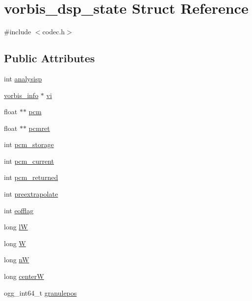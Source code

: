 \hypertarget{structvorbis__dsp__state}{}\section{vorbis\+\_\+dsp\+\_\+state Struct Reference}
\label{structvorbis__dsp__state}


{\ttfamily \#include $<$codec.\+h$>$}

\subsection*{Public Attributes}
\begin{DoxyCompactItemize}
\item 
int \hyperlink{structvorbis__dsp__state_a9b983a6901a311f2d354f2b6c51cf93b}{analysisp}
\item 
\hyperlink{structvorbis__info}{vorbis\+\_\+info} $\ast$ \hyperlink{structvorbis__dsp__state_ab6819a31e79031cdcd8f2ff40a5c1def}{vi}
\item 
float $\ast$$\ast$ \hyperlink{structvorbis__dsp__state_ab33bafd2638e5bea5737709feea89027}{pcm}
\item 
float $\ast$$\ast$ \hyperlink{structvorbis__dsp__state_ab2c2a87593f0d7a3c867ba80102c4260}{pcmret}
\item 
int \hyperlink{structvorbis__dsp__state_a33cf1637859094c31429dace6dfc79e2}{pcm\+\_\+storage}
\item 
int \hyperlink{structvorbis__dsp__state_a6d09bbf3927e337d721b05f669bd70c6}{pcm\+\_\+current}
\item 
int \hyperlink{structvorbis__dsp__state_a8db33e5f4c0b7f31f218c9ff6ccd7ac3}{pcm\+\_\+returned}
\item 
int \hyperlink{structvorbis__dsp__state_aecc3c42d23d876c8bfd396b5c2ac5eb6}{preextrapolate}
\item 
int \hyperlink{structvorbis__dsp__state_af48b32e7555d54a5d18a24385f1296d0}{eofflag}
\item 
long \hyperlink{structvorbis__dsp__state_a7086b355f6ffe286f388e95df943cac0}{lW}
\item 
long \hyperlink{structvorbis__dsp__state_a1cc3a520dcf831fb967341e5095c7b38}{W}
\item 
long \hyperlink{structvorbis__dsp__state_a2ada93ee1004bcc0803238ee4416bc1e}{nW}
\item 
long \hyperlink{structvorbis__dsp__state_a241d3dc3b6c931e93ce53cbf69282350}{centerW}
\item 
ogg\+\_\+int64\+\_\+t \hyperlink{structvorbis__dsp__state_af84a7a4855db2744d1ef73f48cb6b352}{granulepos}

\end{DoxyCompactItemize}

